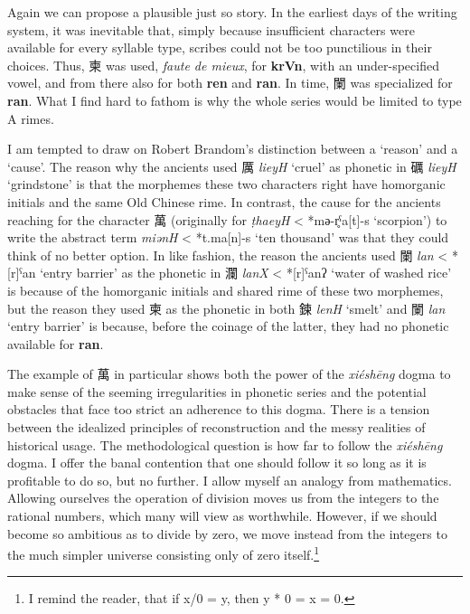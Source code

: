 Again we can propose a  plausible just so story. In the earliest days of the writing system, it was inevitable that, simply because insufficient characters were available for every syllable type, scribes could not be too punctilious in their choices. Thus, 柬 was used, \textit{faute de mieux}, for \textbf{krVn}, with an under-specified vowel,  and from there also for both \textbf{ren} and \textbf{ran}. In time, 闌 was specialized for \textbf{ran}.  What I find hard to fathom is why the whole series would be limited to type A rimes. 

I am tempted to draw on Robert Brandom's distinction between a `reason' and a `cause'. The reason why the ancients used 
厲 \textit{lieyH}  `cruel' as phonetic in 礪 \textit{lieyH} `grindstone' is that the morphemes these two characters right have homorganic initials and the same Old Chinese rime.
In contrast, the cause for the ancients reaching for the character 萬 (originally for  \textit{ṭhaeyH}  < *mә-r̥ˁa[t]-s `scorpion') to write the abstract term \textit{miənH} < *t.ma[n]-s `ten thousand' was that they could think of no better option. 
In like fashion, the reason the ancients used 闌 \textit{lan} < *[r]ˁan `entry barrier' as the phonetic in 瀾 \textit{lanX} < *[r]ˁanʔ `water of washed rice' is because of the homorganic initials and shared rime of these two morphemes, but the reason they used 柬 as the phonetic in both 鍊 \textit{lenH} `smelt' and 闌 \textit{lan} `entry barrier' is because, before the coinage of the latter, they had no phonetic available for \textbf{ran}. 

The example of 萬 in particular shows both the power of the \textit{xiéshēng} dogma to make sense of the seeming irregularities in phonetic series and the potential obstacles that face too strict an adherence to this dogma. There is a  tension between the idealized principles of reconstruction and the messy realities of historical usage. 
The methodological question is how far to follow the \textit{xiéshēng}  dogma. I offer the banal contention that one should follow it so long as it is profitable to do so, but no further. I allow myself an analogy from mathematics. Allowing ourselves the operation of division moves us from the integers to the rational numbers, which many will view as worthwhile. However, if we should become so ambitious as to divide by zero, we move instead from the integers to the much simpler universe consisting only of zero itself.\footnote{I remind the reader, that if x/0 = y, then y * 0 = x = 0.} 


